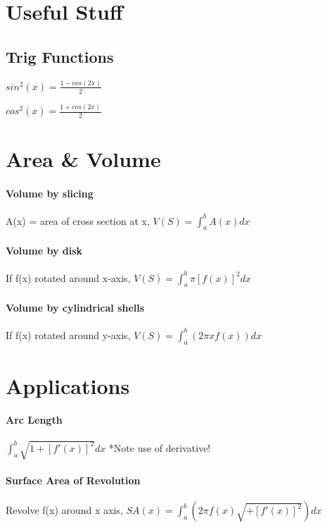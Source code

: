 \documentclass[10pt,landscape]{article}
\begin{document}
	
	\raggedright
	\footnotesize
	\begin{multicols}{4}
\section{Useful Stuff}
\subsection{Trig Functions}

$sin^2(x) = \frac{1-cos(2x)}{2}$

$cos^2(x) = \frac{1+cos(2x)}{2}$


\section{Area \& Volume}

\paragraph{Volume by slicing}
A(x) = area of cross section at x,
$V(S) = \int_{a}^{b}A(x)dx$

\paragraph{Volume by disk}
If f(x) rotated around x-axis,
$V(S) = \int_{a}^{b}\pi [f(x)]^2dx$

\paragraph{Volume by cylindrical shells}
If f(x) rotated around y-axis,
$V(S) = \int_{a}^{b}(2\pi x f(x))dx$

\section{Applications}

\paragraph{Arc Length}
$\int_{a}^{b} \sqrt{1+[f'(x)]^2}dx$
*Note use of derivative!

\paragraph{Surface Area of Revolution}
Revolve f(x) around x axis,
$SA(x) = \int_{a}^{b}(2 \pi f(x) \sqrt{+[f'(x)]^2})dx$


\end{multicols}
\end{document}
